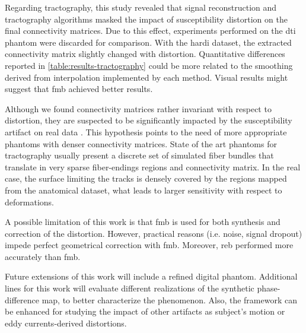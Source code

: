 Regarding tractography, this study revealed that signal
reconstruction and tractography algorithms masked the 
impact of susceptibility distortion on the final connectivity
matrices. Due to this effect, experiments performed on 
the \gls*{dti} phantom were discarded for comparison.
With the \gls*{hardi} dataset, the extracted 
connectivity matrix slightly
changed with distortion. Quantitative differences reported in
\autoref{table:results-tractography} could be more related
to the smoothing derived from interpolation implemented by
each method. Visual results might suggest that \gls*{fmb}
achieved better results.

Although we found connectivity matrices rather invariant with
respect to distortion, they are suspected to be significantly
impacted by the susceptibility artifact on real data 
\cite{irfanoglu_effects_2012}.
This hypothesis points to the need of more appropriate 
phantoms with denser connectivity matrices.
State of the art phantoms for tractography usually present a
discrete set of simulated fiber bundles that translate in 
very sparse fiber-endings regions and connectivity matrix.
In the real case, the surface limiting the tracks is densely 
covered by the regions mapped from the anatomical 
dataset, what leads to larger sensitivity with respect to
deformations.

A possible limitation of this work is that \gls*{fmb} is
used for both synthesis and correction of the distortion.
However, practical reasons (i.e. noise, signal dropout)
impede perfect geometrical correction with \gls*{fmb}.
Moreover, \gls*{reb} performed more accurately 
than \gls*{fmb}.

Future extensions of this work will include a 
refined digital phantom. Additional lines for this
work will evaluate different realizations of the 
synthetic phase-difference map, to better characterize
the phenomenon. Also, the framework can be enhanced 
for studying the impact of other artifacts as 
subject's motion or eddy currents-derived distortions.